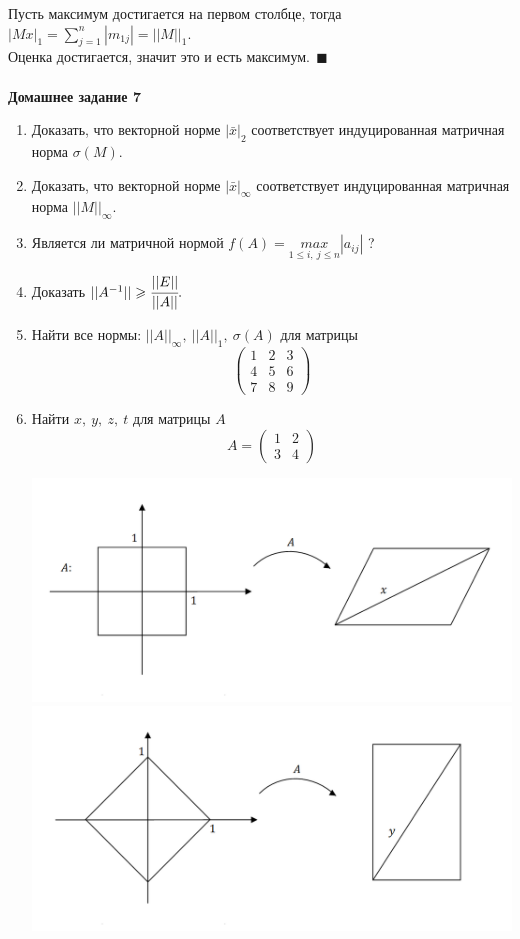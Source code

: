 \documentclass[12pt]{article}
\theoremstyle{definition}
\numberwithin{equation}{section}
\begin{document}
Пусть максимум достигается на первом столбце, тогда $|Mx|_1=\sum\limits_{j=1}^n|m_{1j}|=||M||_1$.\\
Оценка достигается, значит это и есть максимум.$~~\blacksquare$\\ \\
\textbf{Домашнее задание 7}\begin{enumerate}
    \item Доказать, что векторной норме $|\bar x|_2$ соответствует индуцированная матричная норма $\sigma(M)$.
    \item Доказать, что векторной норме $|\bar x|_{\infty}$ соответствует индуцированная матричная норма $||M||_{\infty}$.
    \item Является ли матричной нормой $f(A)=\underset{1\leqslant i,~j\leqslant n}{max}|a_{ij}|$ ?
    \item Доказать $||A^{-1}||\geqslant\cfrac{||E||}{||A||}.$
    \item Найти все нормы: $||A||_{\infty}, ~||A||_1, ~\sigma(A)$ для матрицы \[\begin{pmatrix}
1 & 2 & 3\\
4 & 5 & 6\\
7 & 8 & 9
\end{pmatrix}\]
    \item Найти $x,~y,~z,~t$ для матрицы $A$ \[A=\begin{pmatrix}
1 & 2\\
3 & 4
\end{pmatrix}\]
\begin{center}
\includegraphics[scale=0.6]{l7_2.png}\\
\includegraphics[scale=0.6]{l7_3.png}\\

\end{center}
\end{enumerate}
\end{document}
